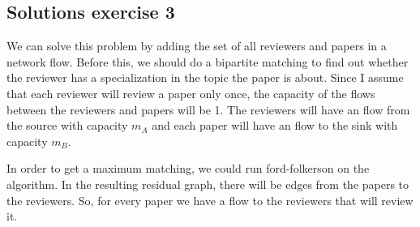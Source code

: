 \documentclass{article}
\begin{document}
\subsection*{Solutions exercise 3}
We can solve this problem by adding the set of all reviewers and papers in a network flow. Before this, we should do a bipartite matching to find out whether the reviewer has a specialization in the topic the paper is about. Since I assume that each reviewer will review a paper only once, the capacity of the flows between the reviewers and papers will be 1. The reviewers will have an flow from the source with capacity $m_A$ and each paper will have an flow to the sink with capacity $m_B$.

In order to get a maximum matching, we could run ford-folkerson on the algorithm. In the resulting residual graph, there will be edges from the papers to the reviewers. So, for every paper we have a flow to the reviewers that will review it.
\end{document}
